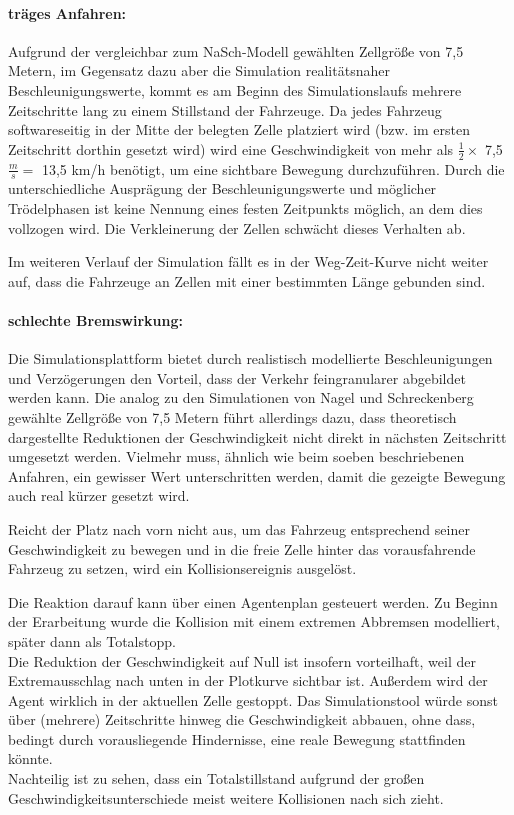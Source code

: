 \paragraph{träges Anfahren:}
\label{sec:accelerategroove}

Aufgrund der vergleichbar zum NaSch-Modell gewählten Zellgröße von 7,5 Metern, im Gegensatz dazu aber die Simulation realitätsnaher Beschleunigungswerte, kommt es am Beginn des Simulationslaufs mehrere Zeitschritte lang zu einem Stillstand der Fahrzeuge.
Da jedes Fahrzeug softwareseitig in der Mitte der belegten Zelle platziert wird (bzw. im ersten Zeitschritt dorthin gesetzt wird) wird eine Geschwindigkeit von mehr als $ \frac{1}{2} \times $ 7,5 $ \frac{m}{s} = $ 13,5 km/h benötigt, um eine sichtbare Bewegung durchzuführen.
Durch die unterschiedliche Ausprägung der Beschleunigungswerte und möglicher Trödelphasen ist keine Nennung eines festen Zeitpunkts möglich, an dem dies vollzogen wird.
Die Verkleinerung der Zellen schwächt dieses Verhalten ab.

Im weiteren Verlauf der Simulation fällt es in der Weg-Zeit-Kurve nicht weiter auf, dass die Fahrzeuge an Zellen mit einer bestimmten Länge gebunden sind.


\paragraph{schlechte Bremswirkung:}
\label{sec:bremsverhalten}

Die Simulationsplattform bietet durch realistisch modellierte Beschleunigungen und Verzögerungen den Vorteil, dass der Verkehr feingranularer abgebildet werden kann.
Die analog zu den Simulationen von Nagel und Schreckenberg gewählte Zellgröße von 7,5 Metern führt allerdings dazu, dass theoretisch dargestellte Reduktionen der Geschwindigkeit nicht direkt in nächsten Zeitschritt umgesetzt werden.
Vielmehr muss, ähnlich wie beim soeben beschriebenen Anfahren, ein gewisser Wert unterschritten werden, damit die gezeigte Bewegung auch real kürzer gesetzt wird.

Reicht der Platz nach vorn nicht aus, um das Fahrzeug entsprechend seiner Geschwindigkeit zu bewegen und in die freie Zelle hinter das vorausfahrende Fahrzeug zu setzen, wird ein Kollisionsereignis ausgelöst.

Die Reaktion darauf kann über einen Agentenplan gesteuert werden.
Zu Beginn der Erarbeitung wurde die Kollision mit einem extremen Abbremsen modelliert, später dann als Totalstopp.
\\
Die Reduktion der Geschwindigkeit auf Null ist insofern vorteilhaft, weil der Extremausschlag nach unten in der Plotkurve sichtbar ist.
Außerdem wird der Agent wirklich in der aktuellen Zelle gestoppt. 
Das Simulationstool würde sonst über (mehrere) Zeitschritte hinweg die Geschwindigkeit abbauen, ohne dass, bedingt durch vorausliegende Hindernisse, eine reale Bewegung stattfinden könnte. 
\\
Nachteilig ist zu sehen, dass ein Totalstillstand aufgrund der großen Geschwindigkeitsunterschiede meist weitere Kollisionen nach sich zieht.

